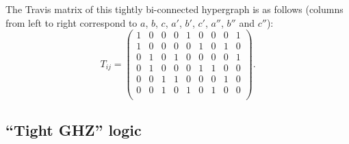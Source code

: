 \documentclass[%
12pt,
prereprint,
showpacs,
showkeys,
preprintnumbers,
amsmath,amssymb,
aps,
pra,
longbibliography,
notitlepage
]{revtex4-1}
\theoremstyle{definition}
\begin{document}
        The Travis matrix of this tightly bi-connected hypergraph is as follows (columns from left to right correspond to $a$, $b$, $c$, $a'$, $b'$, $c'$, $a''$, $b''$ and $c''$):
        \begin{equation}\label{underlying-Travice}
                T_{ij}=\begin{pmatrix}
                        1 &  0 & 0 & 0 & 1 & 0 & 0 & 0 & 1    \\
                        1 &  0 & 0 & 0 & 0 & 1 & 0 & 1 & 0    \\
                        0 &  1 & 0 & 1 & 0 & 0 & 0 & 0 & 1    \\
                        0 &  1 & 0 & 0 & 0 & 1 & 1 & 0 & 0    \\
                        0 &  0 & 1 & 1 & 0 & 0 & 0 & 1 & 0    \\
                        0 &  0 & 1 & 0 & 1 & 0 & 1 & 0 & 0    \\
                \end{pmatrix}
                .
        \end{equation}

        \subsection{``Tight GHZ'' logic}
\end{document}
